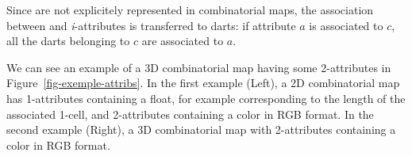 Since  are not explicitely represented in combinatorial maps,
the association between  and \emph{i}-attributes is transferred to
darts: if attribute $a$ is associated to  $c$, all the darts
belonging to $c$ are associated to $a$.


We can see an example of a 3D combinatorial map having some
2-attributes in Figure~\ref{fig-exemple-attribs}. In the first example
(Left), a 2D combinatorial map has 1-attributes containing a float,
for example corresponding to the length of the associated 1-cell, and
2-attributes containing a color in RGB format.  In the second example
(Right), a 3D combinatorial map with 2-attributes containing a color
in RGB format.
%
